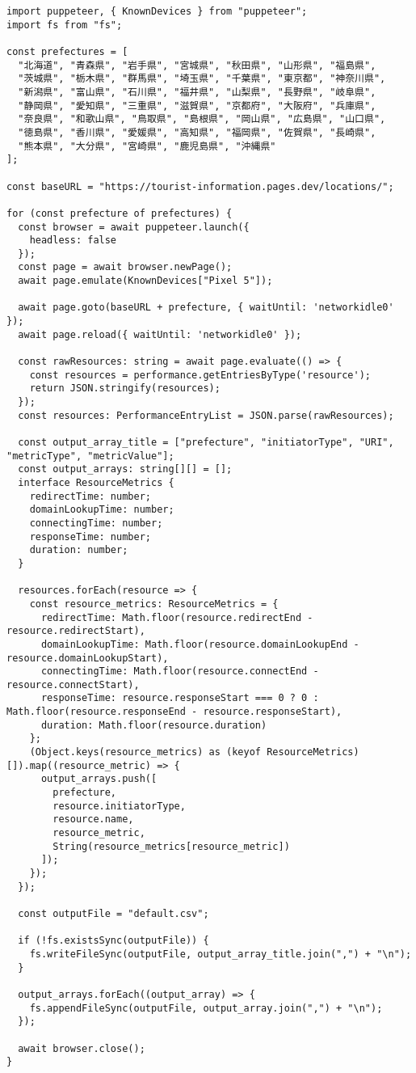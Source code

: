 \begin{lstlisting}[caption={PuppeteerとResource Timing APIを用いたページ読み込み時の画像の読み込み時間の測定},label={lst:PuppeteerとResource Timing APIを用いたページ読み込み時の画像の読み込み時間の測定}]
import puppeteer, { KnownDevices } from "puppeteer";
import fs from "fs";

const prefectures = [
  "北海道", "青森県", "岩手県", "宮城県", "秋田県", "山形県", "福島県",
  "茨城県", "栃木県", "群馬県", "埼玉県", "千葉県", "東京都", "神奈川県",
  "新潟県", "富山県", "石川県", "福井県", "山梨県", "長野県", "岐阜県",
  "静岡県", "愛知県", "三重県", "滋賀県", "京都府", "大阪府", "兵庫県",
  "奈良県", "和歌山県", "鳥取県", "島根県", "岡山県", "広島県", "山口県",
  "徳島県", "香川県", "愛媛県", "高知県", "福岡県", "佐賀県", "長崎県",
  "熊本県", "大分県", "宮崎県", "鹿児島県", "沖縄県"
];

const baseURL = "https://tourist-information.pages.dev/locations/";

for (const prefecture of prefectures) {
  const browser = await puppeteer.launch({
    headless: false
  });
  const page = await browser.newPage();
  await page.emulate(KnownDevices["Pixel 5"]);

  await page.goto(baseURL + prefecture, { waitUntil: 'networkidle0' });
  await page.reload({ waitUntil: 'networkidle0' });

  const rawResources: string = await page.evaluate(() => {
    const resources = performance.getEntriesByType('resource');
    return JSON.stringify(resources);
  });
  const resources: PerformanceEntryList = JSON.parse(rawResources);

  const output_array_title = ["prefecture", "initiatorType", "URI", "metricType", "metricValue"];
  const output_arrays: string[][] = [];
  interface ResourceMetrics {
    redirectTime: number;
    domainLookupTime: number;
    connectingTime: number;
    responseTime: number;
    duration: number;
  }

  resources.forEach(resource => {
    const resource_metrics: ResourceMetrics = {
      redirectTime: Math.floor(resource.redirectEnd - resource.redirectStart),
      domainLookupTime: Math.floor(resource.domainLookupEnd - resource.domainLookupStart),
      connectingTime: Math.floor(resource.connectEnd - resource.connectStart),
      responseTime: resource.responseStart === 0 ? 0 : Math.floor(resource.responseEnd - resource.responseStart),
      duration: Math.floor(resource.duration)
    };
    (Object.keys(resource_metrics) as (keyof ResourceMetrics)[]).map((resource_metric) => {
      output_arrays.push([
        prefecture,
        resource.initiatorType,
        resource.name,
        resource_metric,
        String(resource_metrics[resource_metric])
      ]);
    });
  });

  const outputFile = "default.csv";

  if (!fs.existsSync(outputFile)) {
    fs.writeFileSync(outputFile, output_array_title.join(",") + "\n");
  }

  output_arrays.forEach((output_array) => {
    fs.appendFileSync(outputFile, output_array.join(",") + "\n");
  });

  await browser.close();
}
\end{lstlisting}


